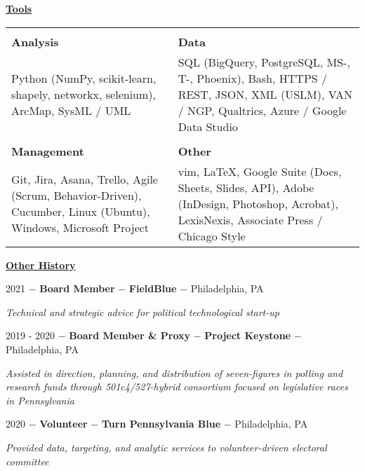 \documentclass[8pt]{article}
\begin{document}
\begin{center}
	\textbf{\underline{\Large{Tools}}} \\
	\begin{tabular}{ p{8cm} p{8cm} }
		 & \\
		\textbf{Analysis} & \textbf{Data} \\
		Python (NumPy, scikit-learn, shapely, networkx, selenium), ArcMap, SysML / UML & SQL (BigQuery, PostgreSQL, MS-, T-, Phoenix), Bash, HTTPS / REST, JSON,  XML (USLM),  VAN / NGP, Qualtrics, Azure / Google Data Studio \\
		 & \\
		\textbf{Management} & \textbf{Other} \\
		Git, Jira, Asana, Trello, Agile (Scrum, Behavior-Driven), Cucumber, Linux (Ubuntu), Windows, Microsoft Project & vim, \LaTeX, Google Suite (Docs, Sheets, Slides, API), Adobe (InDesign, Photoshop, Acrobat), LexisNexis, Associate Press / Chicago Style \\
	\end{tabular}
\end{center}

\begin{center}
	\textbf{\underline{\Large{Other History}}}
\end{center}

2021 $-$ \textbf{Board Member} $-$ \textbf{FieldBlue} $-$ Philadelphia, PA
\begin{adjustwidth}{1cm}{1cm}
	\textit{Technical and strategic advice for political technological start-up}\\
\end{adjustwidth}


2019 - 2020  $-$ \textbf{Board Member \& Proxy} $-$ \textbf{Project Keystone} $-$  Philadelphia, PA
\begin{adjustwidth}{1cm}{1cm}
	\textit{Assisted in direction, planning, and distribution of seven-figures in polling and research funds through 501c4/527-hybrid consortium focused on legislative races in Pennsylvania}\\
\end{adjustwidth}

2020 $-$ \textbf{Volunteer} $-$ \textbf{Turn Pennsylvania Blue} $-$ Philadelphia, PA
\begin{adjustwidth}{1cm}{1cm}
	\textit{Provided data, targeting, and analytic services to volunteer-driven electoral committee}\\
\end{adjustwidth}
\end{document}
